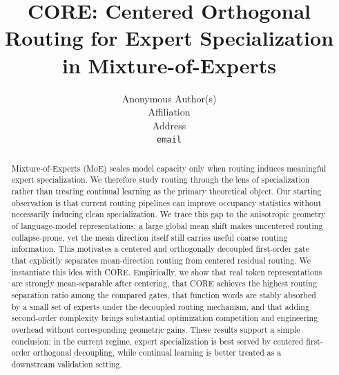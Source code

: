 \documentclass{article}
\title{CORE: Centered Orthogonal Routing for Expert Specialization in Mixture-of-Experts}
\author{%
  Anonymous Author(s)\\
  Affiliation\\
  Address\\
  \texttt{email} \\
}
\begin{document}
\maketitle

\begin{abstract}
Mixture-of-Experts (MoE) scales model capacity only when routing induces meaningful expert specialization. We therefore study routing through the lens of specialization rather than treating continual learning as the primary theoretical object. Our starting observation is that current routing pipelines can improve occupancy statistics without necessarily inducing clean specialization. We trace this gap to the anisotropic geometry of language-model representations: a large global mean shift makes uncentered routing collapse-prone, yet the mean direction itself still carries useful coarse routing information. This motivates a centered and orthogonally decoupled first-order gate that explicitly separates mean-direction routing from centered residual routing. We instantiate this idea with CORE. Empirically, we show that real token representations are strongly mean-separable after centering, that CORE achieves the highest routing separation ratio among the compared gates, that function words are stably absorbed by a small set of experts under the decoupled routing mechanism, and that adding second-order complexity brings substantial optimization competition and engineering overhead without corresponding geometric gains. These results support a simple conclusion: in the current regime, expert specialization is best served by centered first-order orthogonal decoupling, while continual learning is better treated as a downstream validation setting.
\end{abstract}










\end{document}
